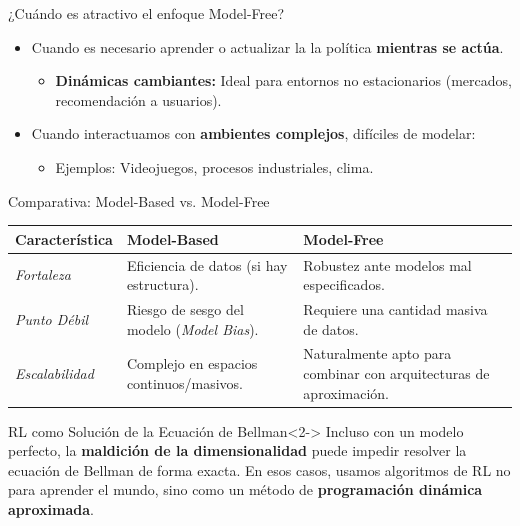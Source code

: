 \documentclass[xcolor=dvipsnames, handout]{beamer}
\begin{document}
\begin{frame}{¿Cu\'ando es atractivo el enfoque Model-Free?}
\begin{itemize}
    \item<1-> Cuando es necesario aprender o actualizar la la política \textbf{mientras se actúa}.
    \begin{itemize}
        \item \textbf{Dinámicas cambiantes:} Ideal para entornos no estacionarios (mercados, recomendación a usuarios).
    \end{itemize}

    \item<3-> Cuando interactuamos con \textbf{ambientes complejos}, dif\'iciles de modelar:
    \begin{itemize}
        \item Ejemplos: Videojuegos, procesos industriales, clima.
    \end{itemize}

\end{itemize}




\end{frame}

\begin{frame}{Comparativa: Model-Based vs. Model-Free}
\small
\begin{center}
\begin{tabular}{l|p{3.5cm}|p{3.5cm}}
\textbf{Caracter\'istica} & \textbf{Model-Based} & \textbf{Model-Free} \\ \hline
\textit{Fortaleza} & Eficiencia de datos (si hay estructura). & Robustez ante modelos mal especificados. \\ \hline
\textit{Punto D\'ebil} & Riesgo de sesgo del modelo (\textit{Model Bias}). & Requiere una cantidad masiva de datos. \\ \hline
\textit{Escalabilidad} & Complejo en espacios continuos/masivos. & Naturalmente apto para combinar con arquitecturas de aproximaci\'on. \\
\end{tabular}
\end{center}

\begin{alertblock}{RL como Soluci\'on de la Ecuaci\'on de Bellman}<2->
    Incluso con un modelo perfecto, la \textbf{maldici\'on de la dimensionalidad} puede impedir resolver la ecuaci\'on de Bellman de forma exacta. En esos casos, usamos algoritmos de RL no para aprender el mundo, sino como un m\'etodo de \textbf{programaci\'on din\'amica aproximada}.
\end{alertblock}
\end{frame}
\end{document}

